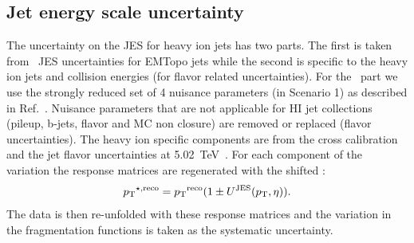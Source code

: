 %

\subsection{Jet energy scale uncertainty}

The uncertainty on the JES for heavy ion jets has two parts.  The first is taken from
 \pp\ JES uncertainties for EMTopo jets while the second is specific to the heavy ion jets
and collision energies (for flavor related uncertainties).  For the \pp\ part we use the strongly reduced
set of 4 nuisance parameters (in Scenario 1) as described in Ref.~\cite{JESuncertaintytwiki}. Nuisance parameters that are not applicable for HI jet collections (pileup, b-jets, flavor and MC non closure) are removed or replaced (flavor uncertainties). The heavy ion specific components are from the cross calibration~\cite{cc2015} and the jet
flavor uncertainties at 5.02~TeV~\cite{2015392}.  For each component of the variation
the response matrices are regenerated with the shifted \ptjet:
\begin{equation}
   \mbox{$p_{\mathrm{T}}$}^{\star,\mathrm{reco}} = \mbox{$p_{\mathrm{T}}$}^{\mathrm{reco}} (1\pm U^{\mathrm{JES}}(\mbox{$p_{\mathrm{T}}$} , \eta)).
\end{equation}
The data is then re-unfolded with these response matrices and the variation in the fragmentation 
functions is taken as the systematic uncertainty.

